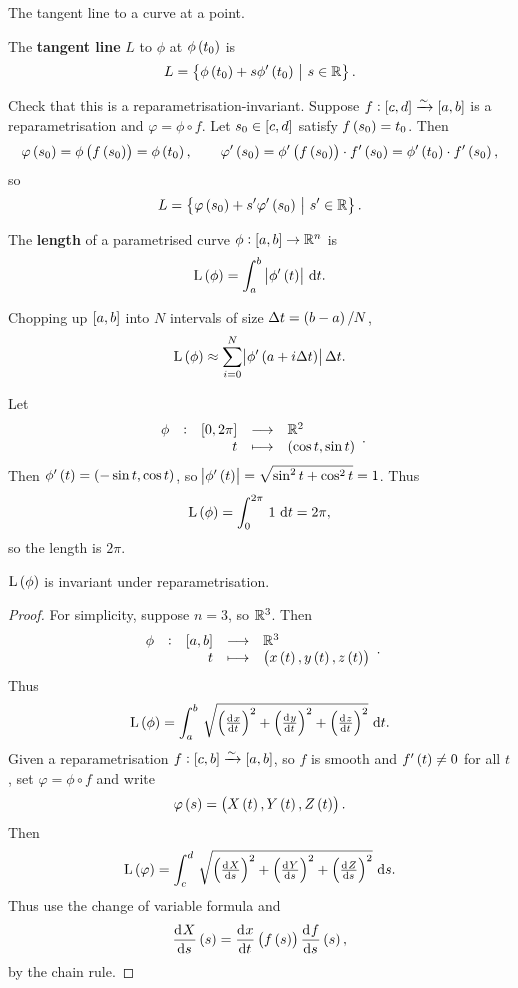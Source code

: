 \begin{example*}
The tangent line to a curve at a point.
\end{example*}

\begin{definition}
The \textbf{tangent line} $ L $ to $ \phi $ at $ \phi\br{t_0} $ is
$$ L = \cbr{\phi\br{t_0} + s\phi'\br{t_0} \st s \in \RR}. $$
\end{definition}

Check that this is a reparametrisation-invariant. Suppose $ f : \sbr{c, d} \xrightarrow{\sim} \sbr{a, b} $ is a reparametrisation and $ \varphi = \phi \circ f $. Let $ s_0 \in \sbr{c, d} $ satisfy $ f\br{s_0} = t_0 $. Then
$$ \varphi\br{s_0} = \phi\br{f\br{s_0}} = \phi\br{t_0}, \qquad \varphi'\br{s_0} = \phi'\br{f\br{s_0}} \cdot f'\br{s_0} = \phi'\br{t_0} \cdot f'\br{s_0}, $$
so
$$ L = \cbr{\varphi\br{s_0} + s'\varphi'\br{s_0} \st s' \in \RR}. $$

\begin{definition}
The \textbf{length} of a parametrised curve $ \phi : \sbr{a, b} \to \RR^n $ is
$$ \L\br{\phi} = \intd{a}{b}{\abs{\phi'\br{t}}}{t}. $$
\end{definition}

Chopping up $ \sbr{a, b} $ into $ N $ intervals of size $ \Delta t = \br{b - a} / N $,
$$ \L\br{\phi} \approx \sum_{i = 0}^N \abs{\phi'\br{a + i\Delta t}}\Delta t. $$

\begin{example*}
Let
$$ \function[\phi]{\sbr{0, 2\pi}}{\RR^2}{t}{\br{\cos t, \sin t}}. $$
Then $ \phi'\br{t} = \br{-\sin t, \cos t} $, so $ \abs{\phi'\br{t}} = \sqrt{\sin^2 t + \cos^2 t} = 1 $. Thus
$$ \L\br{\phi} = \intd{0}{2\pi}{1}{t} = 2\pi, $$
so the length is $ 2\pi $.
\end{example*}

\pagebreak

\begin{proposition}
$ \L\br{\phi} $ is invariant under reparametrisation.
\end{proposition}

\begin{proof}
For simplicity, suppose $ n = 3 $, so $ \mathbb{R}^3 $. Then
$$ \function[\phi]{\sbr{a, b}}{\RR^3}{t}{\br{x\br{t}, y\br{t}, z\br{t}}}. $$
Thus
$$ \L\br{\phi} = \intd{a}{b}{\sqrt{\br{\tod{x}{t}}^2 + \br{\tod{y}{t}}^2 + \br{\tod{z}{t}}^2}}{t}. $$
Given a reparametrisation $ f : \sbr{c, b} \xrightarrow{\sim} \sbr{a, b} $, so $ f $ is smooth and $ f'\br{t} \ne 0 $ for all $ t $, set $ \varphi = \phi \circ f $ and write
$$ \varphi\br{s} = \br{X\br{t}, Y\br{t}, Z\br{t}}. $$
Then
$$ \L\br{\varphi} = \intd{c}{d}{\sqrt{\br{\tod{X}{s}}^2 + \br{\tod{Y}{s}}^2 + \br{\tod{Z}{s}}^2}}{s}. $$
Thus use the change of variable formula and
$$ \dod{X}{s}\br{s} = \dod{x}{t}\br{f\br{s}}\dod{f}{s}\br{s}, $$
by the chain rule.
\end{proof}

